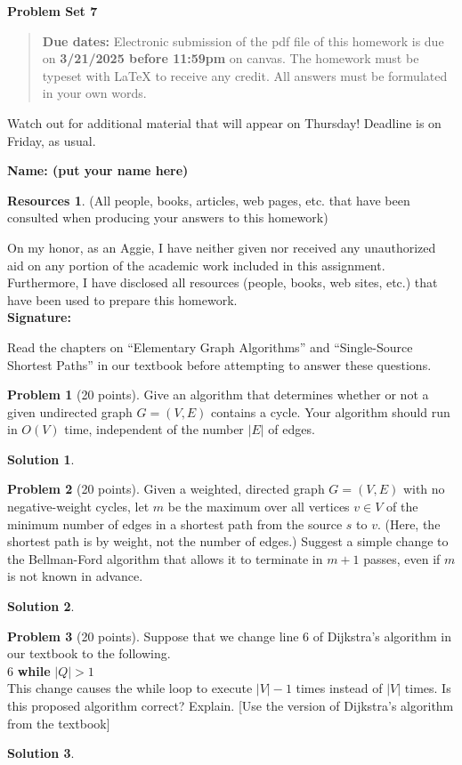 \documentclass{article}
\theoremstyle{definition}
\newtheorem{problem}{Problem}
\newtheorem*{solution}{Solution}
\newtheorem*{resources}{Resources}
\newcommand{\name}[1]{\noindent\textbf{Name: #1}}
\newcommand{\honor}{\noindent On my honor, as an Aggie, I have neither
  given nor received any unauthorized aid on any portion of the
  academic work included in this assignment. Furthermore, I have
  disclosed all resources (people, books, web sites, etc.) that have
  been used to prepare this homework. \\[1ex]
 \textbf{Signature:} \underline{\hspace*{5cm}} }
\newcommand{\problemset}[1]{\begin{center}\textbf{Problem Set
      #1}\end{center}}
\newcommand{\duedate}[2]{\begin{quote}\textbf{Due dates:} Electronic
    submission of the pdf file of this homework is due on
    \textbf{#1} on canvas. The homework must be typeset with LaTeX to
    receive any credit. All answers must be formulated in your own words.\end{quote} }
\begin{document}
\problemset{7}
\duedate{3/21/2025 before 11:59pm}

\textbf{Watch out for additional material that will appear on
  Thursday! Deadline is on Friday, as usual.} 

\name{ (put your name here)}
\begin{resources} (All people, books, articles, web pages, etc. that
  have been consulted when producing your answers to this homework)
\end{resources}
\honor


\newpage


Read the chapters on ``Elementary Graph Algorithms'' and
``Single-Source Shortest Paths'' in our textbook before
attempting to answer these questions.

\begin{problem}[20 points]
Give an algorithm that determines whether or not a given undirected
graph $G=(V,E)$ contains a cycle. Your algorithm should run in $O(V)$
time, independent of the number $|E|$ of edges. 
\end{problem}
\begin{solution}
\end{solution}

\begin{problem}[20 points]
Given a weighted, directed graph $G=(V,E)$ with no negative-weight
cycles, let $m$ be the maximum over all vertices $v\in V$ of the minimum
number of edges in a shortest path from the source $s$ to $v$. (Here, the
shortest path is by weight, not the number of edges.) Suggest a simple
change to the Bellman-Ford algorithm that allows it to terminate in $m+1$
passes, even if $m$ is not known in advance.
\end{problem}
\begin{solution}
\end{solution}

\begin{problem}[20 points]
Suppose that we change line 6 of Dijkstra’s algorithm in our textbook
to the following.\\[1ex]
6 \textbf{while} $|Q| > 1$ \\[1ex] 
This change causes the while loop to execute $|V|-1$ times instead of
$|V |$ times. Is this proposed algorithm correct? Explain. 
[Use the version of Dijkstra's algorithm from the textbook]
\end{problem}
\begin{solution}
\end{solution}
\end{document}

